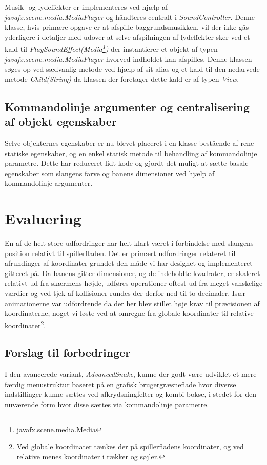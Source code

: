 \documentclass[]{article}
\begin{document}
	Musik- og lydeffekter er implementeres ved hjælp af \textit{javafx.scene.media.MediaPlayer} og håndteres centralt i \textit{SoundController}. Denne klasse, hvis primære opgave er at afspille baggrundsmusikken, vil der ikke gås yderligere i detaljer med udover at selve afspilningen af lydeffekter sker ved et kald til \textit{PlaySoundEffect(Media\footnote{javafx.scene.media.Media})} der instantierer et objekt af typen \textit{javafx.scene.media.MediaPlayer} hvorved indholdet kan afspilles. Denne klassen søges op ved sædvanlig metode ved hjælp af sit alias og et kald til den nedarvede metode \textit{Child(String)} da klassen der foretager dette kald er af typen \textit{View}.
	
	\subsection{Kommandolinje argumenter og centralisering af objekt egenskaber}
	
	Selve objekternes egenskaber er nu blevet placeret i en klasse bestående af rene statiske egenskaber, og en enkel statisk metode til behandling af kommandolinje parametre. Dette har reduceret lidt kode og gjordt det muligt at sætte basale egenskaber som slangens farve og banens dimensioner ved hjælp af kommandolinje argumenter.  
	
	
	\section{Evaluering}
	
	En af de helt store udfordringer har helt klart været i forbindelse med slangens position relativt til spillerfladen. Det er primært udfordringer relateret til afrundinger af koordinater grundet den måde vi har designet og implementeret gitteret på. Da banens gitter-dimensioner, og de indeholdte kvadrater, er skaleret relativt ud fra skærmens højde, udføres operationer oftest ud fra meget vanskelige værdier og ved tjek af kollisioner rundes der derfor ned til to decimaler. Især animationerne var udfordrende da der her blev stillet høje krav til præcisionen af koordinaterne, noget vi løste ved at omregne fra globale koordinater til relative koordinater\footnote{Ved globale koordinater tænkes der på spillerfladens koordinater, og ved relative menes koordinater i rækker og søjler.}. \\
	
	\subsection{Forslag til forbedringer}
	I den avancerede variant, \textit{AdvancedSnake}, kunne der godt være udviklet et mere færdig menustruktur baseret på en grafisk brugergræsneflade hvor diverse indstillinger kunne sættes ved afkrydsningfelter og kombi-bokse, i stedet for den nuværende form hvor disse sættes via kommandolinje parametre. \\
	
\end{document}
